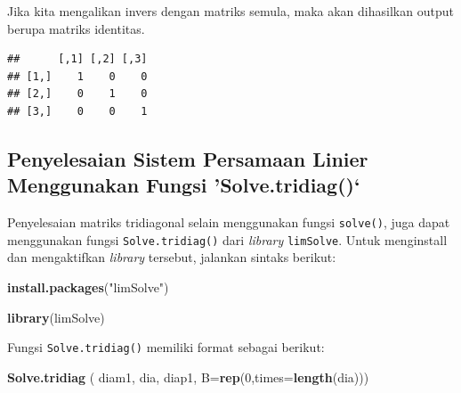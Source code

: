 \documentclass[]{book}
\newenvironment{Shaded}{\begin{snugshade}}{\end{snugshade}}
\newcommand{\DataTypeTok}[1]{\textcolor[rgb]{0.13,0.29,0.53}{#1}}
\newcommand{\DecValTok}[1]{\textcolor[rgb]{0.00,0.00,0.81}{#1}}
\newcommand{\KeywordTok}[1]{\textcolor[rgb]{0.13,0.29,0.53}{\textbf{#1}}}
\newcommand{\NormalTok}[1]{#1}
\newcommand{\OperatorTok}[1]{\textcolor[rgb]{0.81,0.36,0.00}{\textbf{#1}}}
\newcommand{\StringTok}[1]{\textcolor[rgb]{0.31,0.60,0.02}{#1}}
\theoremstyle{definition}
\theoremstyle{definition}
\theoremstyle{definition}
\theoremstyle{remark}
\begin{document}
Jika kita mengalikan invers dengan matriks semula, maka akan dihasilkan output berupa matriks identitas.

\begin{Shaded}
\end{Shaded}

\begin{verbatim}
##      [,1] [,2] [,3]
## [1,]    1    0    0
## [2,]    0    1    0
## [3,]    0    0    1
\end{verbatim}

\hypertarget{solvetridiagfunct}{%
\subsection{Penyelesaian Sistem Persamaan Linier Menggunakan Fungsi 'Solve.tridiag()`}\label{solvetridiagfunct}}

Penyelesaian matriks tridiagonal selain menggunakan fungsi \texttt{solve()}, juga dapat menggunakan fungsi \texttt{Solve.tridiag()} dari \emph{library} \texttt{limSolve}. Untuk menginstall dan mengaktifkan \emph{library} tersebut, jalankan sintaks berikut:

\begin{Shaded}
\begin{Highlighting}[]
\KeywordTok{install.packages}\NormalTok{(}\StringTok{"limSolve"}\NormalTok{)}
\end{Highlighting}
\end{Shaded}

\begin{Shaded}
\begin{Highlighting}[]
\KeywordTok{library}\NormalTok{(limSolve)}
\end{Highlighting}
\end{Shaded}

Fungsi \texttt{Solve.tridiag()} memiliki format sebagai berikut:

\begin{Shaded}
\begin{Highlighting}[]
\KeywordTok{Solve.tridiag}\NormalTok{ ( diam1, dia, diap1, }\DataTypeTok{B=}\KeywordTok{rep}\NormalTok{(}\DecValTok{0}\NormalTok{,}\DataTypeTok{times=}\KeywordTok{length}\NormalTok{(dia)))}
\end{Highlighting}
\end{Shaded}
\end{document}
